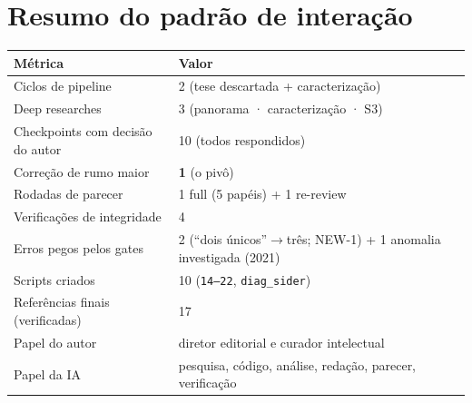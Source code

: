 \documentclass[12pt,a4paper]{article}
\begin{document}
\section{Resumo do padrão de interação}
\begin{longtable}{p{8.5cm}p{6cm}}
\toprule
\textbf{Métrica} & \textbf{Valor} \\
\midrule
Ciclos de pipeline & 2 (tese descartada + caracterização) \\
Deep researches & 3 (panorama · caracterização · S3) \\
Checkpoints com decisão do autor & 10 (todos respondidos) \\
Correção de rumo maior & \textbf{1} (o pivô) \\
Rodadas de parecer & 1 full (5 papéis) + 1 re-review \\
Verificações de integridade & 4 \\
Erros pegos pelos gates & 2 (``dois únicos''$\to$três; NEW-1) + 1 anomalia investigada (2021) \\
Scripts criados & 10 (\texttt{14--22}, \texttt{diag\_sider}) \\
Referências finais (verificadas) & 17 \\
Papel do autor & diretor editorial e curador intelectual \\
Papel da IA & pesquisa, código, análise, redação, parecer, verificação \\
\bottomrule
\end{longtable}

\end{document}
